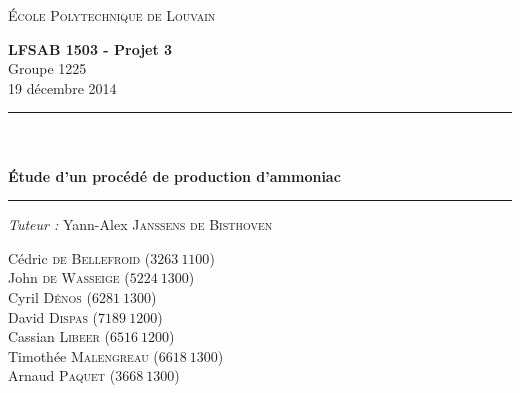 \begin{titlepage}
    \begin{center}
        \vspace*{1cm}
        
        \Large
	\textsc{École Polytechnique de Louvain} \\
        \vspace{1cm}
	
	\textbf{LFSAB 1503 - Projet 3} \\  

	\large
        Groupe 1225 \\
	19 décembre 2014	
        
        \vspace{3cm}
        
	\noindent\rule{14cm}{1pt} \\~\\
        \Huge
	\textbf{Étude d'un procédé de production d'ammoniac} \\
	\noindent\rule{14cm}{1pt}

	\vfill 
        \large

	\begin{flushright}

	\textit{Tuteur : } Yann-Alex \textsc{Janssens de Bisthoven} \vspace{1\baselineskip}

	Cédric \textsc{de Bellefroid}  ($3263~1100$) \\
	John \textsc{de Wasseige}  ($5224~1300$) \\
	Cyril \textsc{Dénos}  ($6281~1300$) \\
	David \textsc{Dispas}  ($7189~1200$) \\
	Cassian \textsc{Libeer}   ($6516~1200$) \\
	Timothée \textsc{Malengreau}  ($6618~1300$) \\
	Arnaud \textsc{Paquet}  ($3668~1300$) \\       
	\end{flushright}
        
    \end{center}
\end{titlepage}
